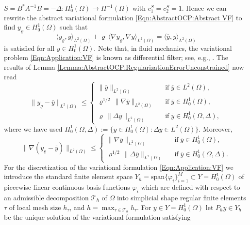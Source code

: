 \documentclass{article}
\numberwithin{equation}{section}
\begin{document}
$S = B^* A^{-1} B = - \Delta : H^1_0(\Omega) \to H^{-1}(\Omega)$
with $c_1^S = c_2^S = 1$. 
Hence we can rewrite the abstract variational formulation
\eqref{Eqn:AbstractOCP:Abstract VF} to find $y_\varrho \in H^1_0(\Omega)$
such that
\begin{equation}\label{Eqn:Application:VF}
  \langle y_\varrho , y \rangle_{L^2(\Omega)} +
  \varrho \, \langle \nabla y_\varrho , \nabla y \rangle_{L^2(\Omega)}
  =
  \langle \overline{y} , y \rangle_{L^2(\Omega)}
\end{equation}
is satisfied for all $y \in H^1_0(\Omega)$. 
Note that, in fluid mechanics, the variational problem \eqref{Eqn:Application:VF} 
is known as differential filter; see, e.g., \cite{John2016Book}. 
The results of Lemma \ref{Lemma:AbstractOCP:RegularizationErrorUnconstrained} now read
\[
  \| y_\varrho - \overline{y} \|_{L^2(\Omega)} \leq
  \left \{
    \begin{array}{ccl}
      \| \overline{y} \|_{L^2(\Omega)}
      & & \mbox{if} \; \overline{y} \in L^2(\Omega), \\[1mm]
      \varrho^{1/2} \, \| \nabla \overline{y} \|_{L^2(\Omega)}
      & & \mbox{if} \; \overline{y} \in H^1_0(\Omega), \\[1mm]
      \varrho \, \| \Delta \overline{y} \|_{L^2(\Omega)}
      & & \mbox{if} \; \overline{y} \in H^1_0(\Omega,\Delta),
    \end{array} \right.
\]
where we have used
$H^1_0(\Omega,\Delta) := \{ y \in H^1_0(\Omega) : \Delta y \in L^2(\Omega) \}$.
Moreover,
\[
  \| \nabla(y_\varrho - \overline{y}) \|_{L^2(\Omega)} \leq
  \left \{
    \begin{array}{ccl}
      \| \nabla \overline{y} \|_{L^2(\Omega)}
      & & \mbox{if} \; \overline{y} \in H^1_0(\Omega), \\[1mm]
      \varrho^{1/2} \, \| \Delta \overline{y} \|_{L^2(\Omega)}
      & & \mbox{if} \; \overline{y} \in H^1_0(\Omega,\Delta).
    \end{array} \right.
\]
For the discretization of the variational formulation
\eqref{Eqn:Application:VF} we introduce the standard finite
element space $Y_h = \mbox{span} \{ \varphi_i \}_{i=1}^M \subset
Y = H^1_0(\Omega)$ of piecewise linear continuous basis functions
$\varphi_i$ which are defined with respect to an admissible decomposition 
$\mathcal{T}_h$ of $\Omega$ into simplicial shape regular finite elements
$\tau$ of local mesh size $h_\tau$, and $h = \max_{\tau \in \mathcal{T}_h} h_\tau$.
For $y \in Y = H^1_0(\Omega)$ let $P_hy \in Y_h$ be the unique solution
of the variational formulation satisfying
\end{document}
